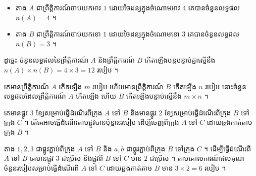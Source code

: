 \begin{itemize}
  \item តាង $A$ ជាព្រឹត្តិការណ៍ចាប់យកអាវ $1$ ដោយចៃដន្យក្នុងចំណោមអាវ $4$ គេបានចំនួនលទ្ធផល $n(A) = 4$ ។
  \item តាង $B$ ជាព្រឹត្តិការណ៍ចាប់យកខោ $1$ ដោយចៃដន្យក្នុងចំណោមខោ $3$ គេបានចំនួនលទ្ធផល $n(B) = 3$ ។
\end{itemize}
ដូច្នេះ ចំនួនលទ្ធផលនៃព្រឹត្តិការណ៍ $A$ និងព្រឹត្តិការណ៍ $B$ កើតឡើងបន្តបន្ទាប់គ្នាស្មើនឹង $n(A)\times n(B) = 4\times 3 = 12$ របៀប ។

\begin{formulaBox}[ជាទូទៅ]
គេមានព្រឹត្តិការណ៍ $A$ កើតឡើង $m$ របៀប ហើយមានព្រឹត្តិការណ៍ $B$ កើតឡើង $n$ របៀប នោះចំនួនលទ្ធផលដែលព្រឹត្តិការណ៍ $A$ កើតឡើង ហើយ $B$ កើតឡើងបន្ទាប់ស្មើនឹង $m\times n$ ។
\end{formulaBox}

\begin{example}[លំហាត់គំរូ]
គេមានផ្លូវ $3$ ខ្សែសម្រាប់ធ្វើដំណើរពីក្រុង $A$ ទៅ $B$ និងមានផ្លូវ $2$ ខ្សែសម្រាប់ធ្វើដំណើរពីក្រុង $B$ ទៅក្រុង $C$ ។ តើគេអាចធ្វើដំណើរតាមផ្លូវបានប៉ុន្មានរបៀប ដើម្បីចេញពីក្រុង $A$ ទៅ $C$ ដោយឆ្លងកាត់តាមក្រុង $B$ ។
\end{example}
\ans
\begin{center}
\end{center}
តាង $1, 2, 3$ ជាផ្លូវភ្ជាប់ពីក្រុង $A$ ទៅ $B$ និង $a, b$ ជាផ្លូវភ្ជាប់ពីក្រុង $B$ ទៅក្រុង $C$ ។ ដើម្បីធ្វើដំណើរពី $A$ ទៅ $B$ គេមានផ្លូវ $3$ ជម្រើស និងផ្លូវពី $B$ ទៅ $C$ មាន $2$ ជម្រើស ។ តាមគោលការណ៍ផលគុណចំនួនរបៀបសម្រាប់ធ្វើដំណើរពី $A$ ទៅ $C$ ដោយឆ្លងកាត់តាម $B$ មាន $3\times 2 = 6$ របៀប ។

